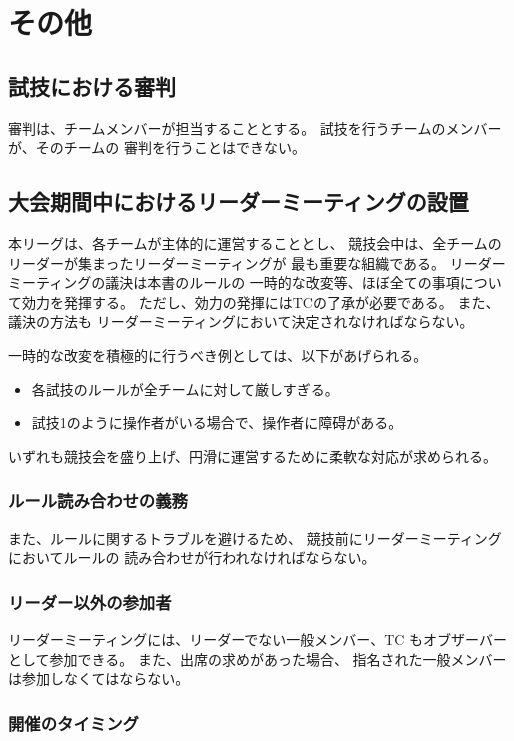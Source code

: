 \documentclass[a4j]{jarticle}
\begin{document}
\section{その他}

\subsection{試技における審判}

審判は、チームメンバーが担当することとする。
試技を行うチームのメンバーが、そのチームの
審判を行うことはできない。

\subsection{大会期間中におけるリーダーミーティングの設置}

本リーグは、各チームが主体的に運営することとし、
競技会中は、全チームのリーダーが集まったリーダーミーティングが
最も重要な組織である。
リーダーミーティングの議決は本書のルールの
一時的な改変等、ほぼ全ての事項について効力を発揮する。
ただし、効力の発揮にはTCの了承が必要である。
また、議決の方法も
リーダーミーティングにおいて決定されなければならない。


一時的な改変を積極的に行うべき例としては、以下があげられる。
\begin{itemize}
	\item 各試技のルールが全チームに対して厳しすぎる。
	\item 試技1のように操作者がいる場合で、操作者に障碍がある。
\end{itemize}
いずれも競技会を盛り上げ、円滑に運営するために柔軟な対応が求められる。

\subsubsection{ルール読み合わせの義務}

また、ルールに関するトラブルを避けるため、
競技前にリーダーミーティングにおいてルールの
読み合わせが行われなければならない。

\subsubsection{リーダー以外の参加者}

リーダーミーティングには、リーダーでない一般メンバー、TC
もオブザーバーとして参加できる。
また、出席の求めがあった場合、
指名された一般メンバーは参加しなくてはならない。

\subsubsection{開催のタイミング}
\end{document}
